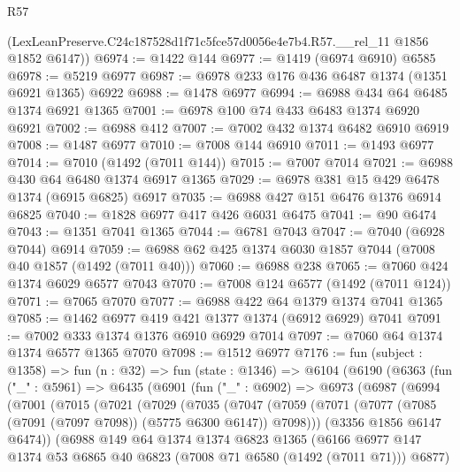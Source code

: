 \begin{lexlean}{R57}
\begin{coremodule}
      (LexLeanPreserve.C24c187528d1f71c5fce57d0056e4e7b4.R57.__rel_11 @1856 @1852 @6147))
@6974 := @1422 @144
@6977 := @1419 (@6974 @6910) @6585
@6978 := @5219 @6977
@6987 := @6978 @233 @176 @436 @6487 @1374 (@1351 @6921 @1365) @6922
@6988 := @1478 @6977
@6994 := @6988 @434 @64 @6485 @1374 @6921 @1365
@7001 := @6978 @100 @74 @433 @6483 @1374 @6920 @6921
@7002 := @6988 @412
@7007 := @7002 @432 @1374 @6482 @6910 @6919
@7008 := @1487 @6977
@7010 := @7008 @144 @6910
@7011 := @1493 @6977
@7014 := @7010 (@1492 (@7011 @144))
@7015 := @7007 @7014
@7021 := @6988 @430 @64 @6480 @1374 @6917 @1365
@7029 := @6978 @381 @15 @429 @6478 @1374 (@6915 @6825) @6917
@7035 := @6988 @427 @151 @6476 @1376 @6914 @6825
@7040 := @1828 @6977 @417 @426 @6031 @6475
@7041 := @90 @6474
@7043 := @1351 @7041 @1365
@7044 := @6781 @7043
@7047 := @7040 (@6928 @7044) @6914
@7059 := @6988 @62 @425 @1374 @6030 @1857 @7044 (@7008 @40 @1857 (@1492 (@7011 @40)))
@7060 := @6988 @238
@7065 := @7060 @424 @1374 @6029 @6577 @7043
@7070 := @7008 @124 @6577 (@1492 (@7011 @124))
@7071 := @7065 @7070
@7077 := @6988 @422 @64 @1379 @1374 @7041 @1365
@7085 := @1462 @6977 @419 @421 @1377 @1374 (@6912 @6929) @7041
@7091 := @7002 @333 @1374 @1376 @6910 @6929 @7014
@7097 := @7060 @64 @1374 @1374 @6577 @1365 @7070
@7098 := @1512 @6977
@7176 := fun (subject : @1358) =>
  fun (n : @32) =>
  fun (state : @1346) =>
  @6104
    (@6190
      (@6363
        (fun ("_" : @5961) =>
        @6435
          (@6901
            (fun ("_" : @6902) =>
            @6973
              (@6987
                (@6994
                  (@7001
                    (@7015
                      (@7021
                        (@7029
                          (@7035
                            (@7047
                              (@7059
                                (@7071
                                  (@7077 (@7085 (@7091 (@7097 @7098)) (@5775 @6300 @6147)) @7098)))
                              (@3356 @1856 @6147 @6474))
                            (@6988
                              @149
                              @64
                              @1374
                              @1374
                              @6823
                              @1365
                              (@6166
                                @6977
                                @147
                                @1374
                                @53
                                @6865
                                @40
                                @6823
                                (@7008 @71 @6580 (@1492 (@7011 @71)))
                                @6877)

\end{coremodule}
\end{lexlean}
